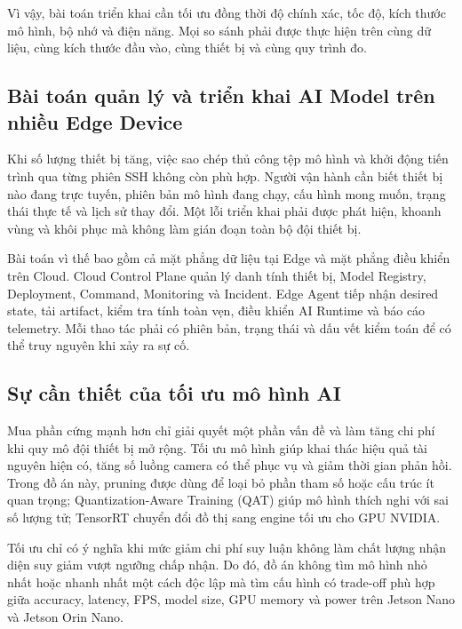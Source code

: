 Vì vậy, bài toán triển khai cần tối ưu đồng thời độ chính xác, tốc độ, kích thước
mô hình, bộ nhớ và điện năng. Mọi so sánh phải được thực hiện trên cùng dữ liệu,
cùng kích thước đầu vào, cùng thiết bị và cùng quy trình đo.

\subsection{Bài toán quản lý và triển khai AI Model trên nhiều Edge Device}

Khi số lượng thiết bị tăng, việc sao chép thủ công tệp mô hình và khởi động tiến
trình qua từng phiên SSH không còn phù hợp. Người vận hành cần biết thiết bị nào
đang trực tuyến, phiên bản mô hình đang chạy, cấu hình mong muốn, trạng thái
thực tế và lịch sử thay đổi. Một lỗi triển khai phải được phát hiện, khoanh vùng và
khôi phục mà không làm gián đoạn toàn bộ đội thiết bị.

Bài toán vì thế bao gồm cả mặt phẳng dữ liệu tại Edge và mặt phẳng điều khiển
trên Cloud. Cloud Control Plane quản lý danh tính thiết bị, Model Registry,
Deployment, Command, Monitoring và Incident. Edge Agent tiếp nhận desired
state, tải artifact, kiểm tra tính toàn vẹn, điều khiển AI Runtime và báo cáo
telemetry. Mỗi thao tác phải có phiên bản, trạng thái và dấu vết kiểm toán để có
thể truy nguyên khi xảy ra sự cố.

\subsection{Sự cần thiết của tối ưu mô hình AI}

Mua phần cứng mạnh hơn chỉ giải quyết một phần vấn đề và làm tăng chi phí khi
quy mô đội thiết bị mở rộng. Tối ưu mô hình giúp khai thác hiệu quả tài nguyên
hiện có, tăng số luồng camera có thể phục vụ và giảm thời gian phản hồi. Trong đồ
án này, pruning được dùng để loại bỏ phần tham số hoặc cấu trúc ít quan trọng;
Quantization-Aware Training (QAT) giúp mô hình thích nghi với sai số lượng tử;
TensorRT chuyển đổi đồ thị sang engine tối ưu cho GPU NVIDIA.

Tối ưu chỉ có ý nghĩa khi mức giảm chi phí suy luận không làm chất lượng nhận
diện suy giảm vượt ngưỡng chấp nhận. Do đó, đồ án không tìm mô hình nhỏ nhất
hoặc nhanh nhất một cách độc lập mà tìm cấu hình có trade-off phù hợp giữa
accuracy, latency, FPS, model size, GPU memory và power trên Jetson Nano và
Jetson Orin Nano.